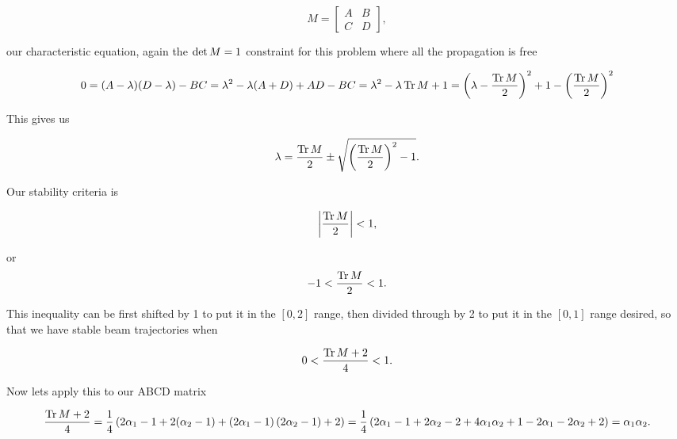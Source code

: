 {\begin{equation}\label{eqn:problemSet4Problem2:920}
M =
\begin{bmatrix}
A & B \\
C & D
\end{bmatrix},
\end{equation}

our characteristic equation, again the $\operatorname{det} M = 1$ constraint for this problem where all the propagation is free

\begin{dmath}\label{eqn:problemSet4Problem2:940}
0
= (A - \lambda)(D - \lambda) - B C
= \lambda^2 - \lambda( A + D ) + A D - BC
= \lambda^2 - \lambda \tr M + 1
= \left(\lambda - \frac{\tr M}{2}\right)^2 + 1 - \left(\frac{\tr M}{2}\right)^2
\end{dmath}

This gives us

\begin{dmath}\label{eqn:problemSet4Problem2:960}
\lambda =
\frac{\tr M}{2} \pm \sqrt{ \left(\frac{\tr M}{2}\right)^2 - 1 }.
\end{dmath}

Our stability criteria is

\begin{dmath}\label{eqn:problemSet4Problem2:980}
\Abs{ \frac{\tr M}{2} } < 1,
\end{dmath}

or
\begin{equation}\label{eqn:problemSet4Problem2:1000}
-1 < \frac{\operatorname{Tr} M}{2} < 1.
\end{equation}

This inequality can be first shifted by 1 to put it in the $[0,2]$ range, then divided through by 2 to put it in the $[0, 1]$ range desired, so that we have stable beam trajectories when

\begin{equation}\label{eqn:problemSet4Problem2:1020}
0 < \frac{\operatorname{Tr} M + 2 }{4} < 1.
\end{equation}

Now lets apply this to our ABCD matrix

\begin{dmath}\label{eqn:problemSet4Problem2:1040}
\frac{\tr M + 2 }{4}
=
\inv{4}
\left(
2 \alpha_1 - 1
+
2(\alpha_2 - 1) +
\left(
2 \alpha_1 - 1
\right)
\left(
2 \alpha_2 - 1
\right)
+ 2
\right)
=
\inv{4}
\left(
2 \alpha_1 - 1
+
2 \alpha_2 - 2 +
4 \alpha_1 \alpha_2 + 1 - 2 \alpha_1 - 2 \alpha_2
+ 2
\right)
=
\alpha_1 \alpha_2.
\end{dmath}

}
